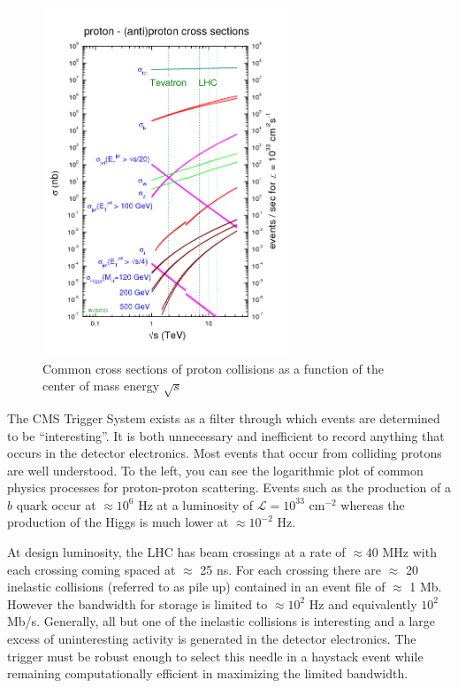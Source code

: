 \begin{figure}
\begin{center}
\includegraphics[width=2.9in]{figures/exp_proj/pdf_xsec.png}
\caption{Common cross sections of proton collisions as a function of the center of mass energy $\sqrt{s}$}
\end{center}
\label{fig:pdf_xsec}
\end{figure}

The CMS Trigger System exists as a filter through which events are determined to be ``interesting''. 
It is both  unnecessary and inefficient to record anything that occurs in the detector electronics. 
Most events that occur from colliding protons are well understood. To the left, you can see the 
logarithmic plot of common physics processes for proton-proton scattering. Events such as the production 
of a $b$ quark  occur at $\approx 10^6$ Hz at a luminosity of $\mathcal{L} = 10^{33}$ cm$^{-2}$ 
whereas the production of the Higgs is much lower at $\approx 10^{-2}$ Hz.  

At design luminosity, the LHC has beam crossings at a rate of $\approx 40$ MHz with 
each crossing coming spaced at $\approx$ 25 ns. 
For each crossing there are $\approx$ 20 inelastic collisions (referred to as pile up) 
contained in an event file of $\approx$ 1 Mb. 
However the bandwidth for storage is limited to $\approx 10^2$ Hz and equivalently $10^2$ Mb/s. 
Generally, all but one of the inelastic collisions is interesting and a large excess of uninteresting 
activity is generated in the detector electronics. The trigger must be robust enough to select 
this needle in a haystack event while remaining computationally efficient in maximizing the limited bandwidth.  

